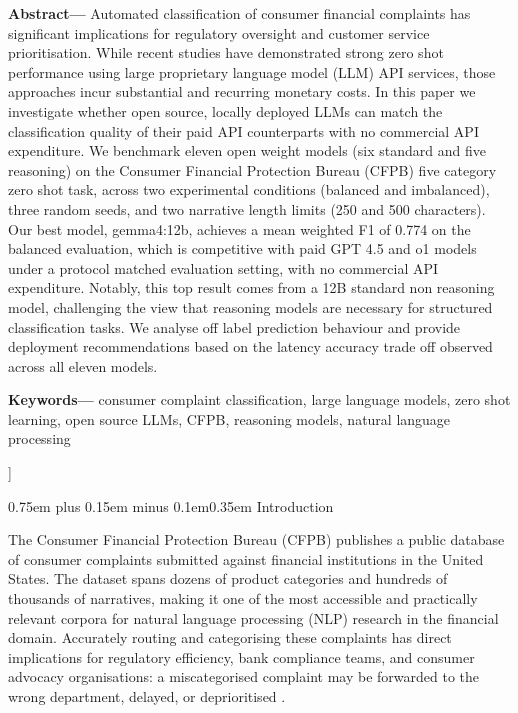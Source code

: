 \documentclass[10pt,a4paper,twocolumn]{article}
\makeatletter
\renewcommand\section{\@startsection{section}{1}{0pt}%
  {0.75em plus 0.15em minus 0.1em}{0.35em}%
  {\normalfont\normalsize\itshape}}
\makeatother
\begin{document}
\begin{minipage}{0.96\textwidth}
\vspace{0.9em}
\noindent\textbf{Abstract---}
Automated classification of consumer financial complaints has significant implications for regulatory oversight and customer service prioritisation. While recent studies have demonstrated strong zero shot performance using large proprietary language model (LLM) API services, those approaches incur substantial and recurring monetary costs. In this paper we investigate whether open source, locally deployed LLMs can match the classification quality of their paid API counterparts with no commercial API expenditure. We benchmark eleven open weight models (six standard and five reasoning) on the Consumer Financial Protection Bureau (CFPB) five category zero shot task, across two experimental conditions (balanced and imbalanced), three random seeds, and two narrative length limits (250 and 500 characters). Our best model, gemma4:12b, achieves a mean weighted F1 of 0.774 on the balanced evaluation, which is competitive with paid GPT 4.5 and o1 models under a protocol matched evaluation setting, with no commercial API expenditure. Notably, this top result comes from a 12B standard non reasoning model, challenging the view that reasoning models are necessary for structured classification tasks. We analyse off label prediction behaviour and provide deployment recommendations based on the latency accuracy trade off observed across all eleven models.

\vspace{0.5em}
\noindent\textbf{Keywords---} consumer complaint classification, large language models, zero shot learning, open source LLMs, CFPB, reasoning models, natural language processing
\end{minipage}
\vspace{1em}
]

\section{Introduction}
\label{sec:intro}

The Consumer Financial Protection Bureau (CFPB) publishes a public
database of consumer complaints submitted against financial institutions
in the United States. The dataset spans dozens of product categories
and hundreds of thousands of narratives, making it one of the most
accessible and practically relevant corpora for natural language
processing (NLP) research in the financial domain. Accurately routing
and categorising these complaints has direct implications for
regulatory efficiency, bank compliance teams, and consumer advocacy
organisations: a miscategorised complaint may be forwarded to the wrong
department, delayed, or deprioritised
\cite{das2024explainable,liu2024framework,jondhale2024cfpb}.
\end{document}
